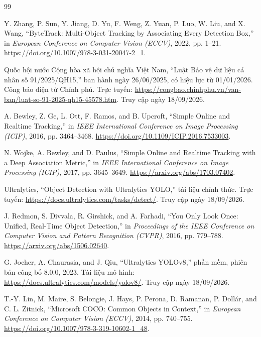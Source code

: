 \clearpage
\begin{thebibliography}{99}
\raggedright
{}

 Y. Zhang, P. Sun, Y. Jiang, D. Yu, F. Weng, Z. Yuan, P. Luo, W. Liu, and X. Wang, ``ByteTrack: Multi-Object Tracking by Associating Every Detection Box,'' in \textit{European Conference on Computer Vision (ECCV)}, 2022, pp. 1--21. \url{https://doi.org/10.1007/978-3-031-20047-2_1}.

 Quốc hội nước Cộng hòa xã hội chủ nghĩa Việt Nam, ``Luật Bảo vệ dữ liệu cá nhân số 91/2025/QH15,'' ban hành ngày 26/06/2025, có hiệu lực từ 01/01/2026. Công báo điện tử Chính phủ. Trực tuyến: \url{https://congbao.chinhphu.vn/van-ban/luat-so-91-2025-qh15-45578.htm}. Truy cập ngày 18/09/2026.

 A. Bewley, Z. Ge, L. Ott, F. Ramos, and B. Upcroft, ``Simple Online and Realtime Tracking,'' in \textit{IEEE International Conference on Image Processing (ICIP)}, 2016, pp. 3464--3468. \url{https://doi.org/10.1109/ICIP.2016.7533003}.

 N. Wojke, A. Bewley, and D. Paulus, ``Simple Online and Realtime Tracking with a Deep Association Metric,'' in \textit{IEEE International Conference on Image Processing (ICIP)}, 2017, pp. 3645--3649. \url{https://arxiv.org/abs/1703.07402}.

 Ultralytics, ``Object Detection with Ultralytics YOLO,'' tài liệu chính thức. Trực tuyến: \url{https://docs.ultralytics.com/tasks/detect/}. Truy cập ngày 18/09/2026.

 J. Redmon, S. Divvala, R. Girshick, and A. Farhadi, ``You Only Look Once: Unified, Real-Time Object Detection,'' in \textit{Proceedings of the IEEE Conference on Computer Vision and Pattern Recognition (CVPR)}, 2016, pp. 779--788. \url{https://arxiv.org/abs/1506.02640}.

 G. Jocher, A. Chaurasia, and J. Qiu, ``Ultralytics YOLOv8,'' phần mềm, phiên bản công bố 8.0.0, 2023. Tài liệu mô hình: \url{https://docs.ultralytics.com/models/yolov8/}. Truy cập ngày 18/09/2026.

 T.-Y. Lin, M. Maire, S. Belongie, J. Hays, P. Perona, D. Ramanan, P. Dollár, and C. L. Zitnick, ``Microsoft COCO: Common Objects in Context,'' in \textit{European Conference on Computer Vision (ECCV)}, 2014, pp. 740--755. \url{https://doi.org/10.1007/978-3-319-10602-1_48}.


\end{thebibliography}

